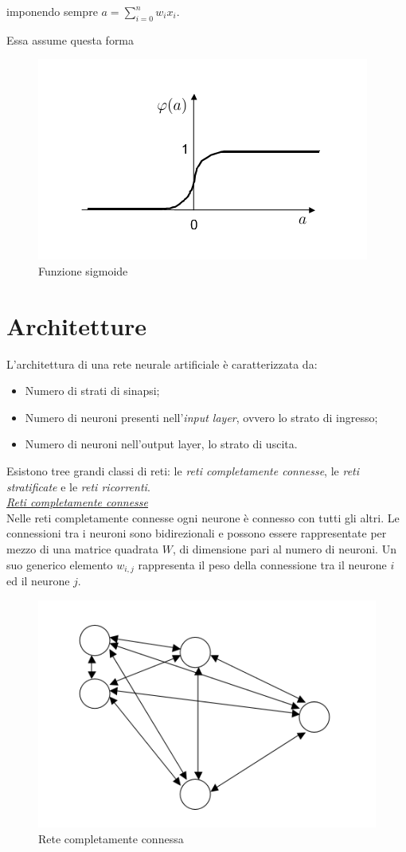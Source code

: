 \documentclass[12pt,a4paper,oneside]{book}
\begin{document}
		imponendo sempre $a=\sum\limits_{i=0}^n w_{i}x_{i}$.
		
		\clearpage
		Essa assume questa forma
		\begin{figure}[h]
			\centering
			\includegraphics[width=0.6\linewidth]{IMMAGINI/sigmoide}
			\caption{ Funzione sigmoide }
			\label{fig:sigmoide}
		\end{figure}
	
	
	\section{Architetture}
		
		L'architettura di una rete neurale artificiale è caratterizzata da:
		
		\begin{itemize}
			\item Numero di strati di sinapsi;
			\item Numero di neuroni presenti nell'\emph{input layer}, ovvero lo strato di ingresso;
			\item Numero di neuroni nell'{output layer}, lo strato di uscita.
		\end{itemize}
		
		Esistono tree grandi classi di reti: le \emph{reti completamente connesse}, le \emph{reti stratificate} e le \emph{reti ricorrenti}.\\	
		
		\underline{\emph{Reti completamente connesse}}\\
		Nelle reti completamente connesse ogni neurone è connesso con tutti gli altri. Le connessioni tra i neuroni sono bidirezionali e possono essere rappresentate per mezzo di una matrice quadrata $W$, di dimensione pari al numero di neuroni. Un suo generico elemento $w_{i,j}$ rappresenta il peso della connessione tra il neurone $i$ ed il neurone $j$.  
		
		\begin{figure}[h]
			\centering
			\includegraphics[width=0.7\linewidth]{IMMAGINI/completamenteconnesssa}
			\caption{ Rete completamente connessa}
			\label{fig:completamenteconnesssa}
		\end{figure}
		
\end{document}
